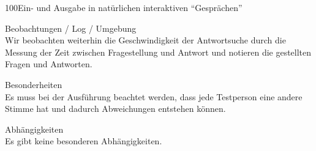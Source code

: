 \begin{testcase}{100}{Ein- und Ausgabe in natürlichen interaktiven
"`Gesprächen"'}
\item[Beobachtungen / Log / Umgebung]~\\
Wir beobachten weiterhin die Geschwindigkeit der Antwortsuche durch die Messung
der Zeit zwischen Fragestellung und Antwort und notieren
die gestellten Fragen und \NewsGenies Antworten.

\item[Besonderheiten]~\\
Es muss bei der Ausführung beachtet werden, dass jede Testperson eine andere
Stimme hat und dadurch Abweichungen entstehen können.

\item[Abhängigkeiten]~\\
Es gibt keine besonderen Abhängigkeiten.

\end{testcase}

